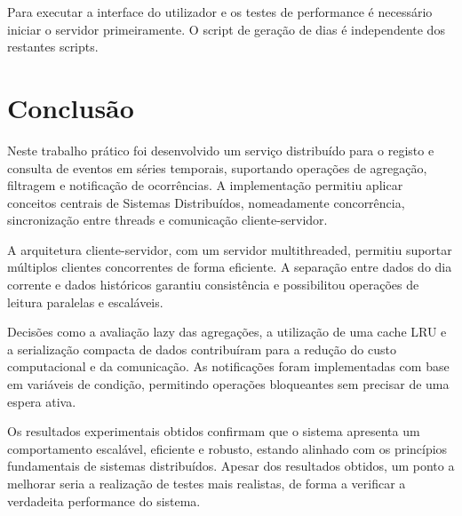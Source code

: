 \documentclass[11pt, a4paper, fleqn]{article}
\begin{document}
	Para executar a interface do utilizador e os testes de performance é necessário iniciar o servidor primeiramente. O script de geração de dias é independente dos restantes scripts.
	
	\section{Conclusão}
	
	Neste trabalho prático foi desenvolvido um serviço distribuído para o registo e consulta de eventos em séries temporais, suportando operações de agregação, filtragem e notificação de ocorrências. A implementação permitiu aplicar conceitos centrais de Sistemas Distribuídos, nomeadamente concorrência, sincronização entre threads e comunicação cliente-servidor.
	
	A arquitetura cliente-servidor, com um servidor multithreaded, permitiu suportar múltiplos clientes concorrentes de forma eficiente. A separação entre dados do dia corrente e dados históricos garantiu consistência e possibilitou operações de leitura paralelas e escaláveis.
	
	Decisões como a avaliação lazy das agregações, a utilização de uma cache LRU e a serialização compacta de dados contribuíram para a redução do custo computacional e da comunicação. As notificações foram implementadas com base em variáveis de condição, permitindo operações bloqueantes sem precisar de uma espera ativa.
	
	Os resultados experimentais obtidos confirmam que o sistema apresenta um comportamento escalável, eficiente e robusto, estando alinhado com os princípios fundamentais de sistemas distribuídos. Apesar dos resultados obtidos, um ponto a melhorar seria a realização de testes mais realistas, de forma a verificar a verdadeita performance do sistema.
	
	
\end{document}
